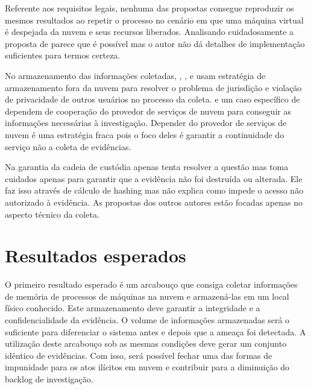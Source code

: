 \documentclass[12pt,				%
	openright,			%
	oneside,			%
	a4paper,			%
	english,			%
	brazil				%
	]{abntex2}
\begin{document}
Referente aos requisitos legais, nenhuma das propostas consegue reproduzir os mesmos resultados ao repetir o processo no cenário em que uma máquina virtual é despejada da nuvem e seus 
recursos liberados. Analisando cuidadosamente a proposta de \cite{George2012} parece que é possível mas o autor não dá detalhes de implementação suficientes para termos certeza.

No armazenamento das informações coletadas, \cite{Reichert2015}, \cite{George2012}, \cite{Poisel2013} e \cite{Dykstra2013} usam estratégia de armazenamento fora da nuvem para 
resolver o problema de jurisdição e violação de privacidade de outros usuários no processo da coleta. \cite{Sang2013} e um caso específico de \cite{George2012} dependem de 
cooperação do provedor de serviços de nuvem para conseguir as informações necessárias à investigação. Depender do provedor de serviços de nuvem é uma estratégia fraca pois o foco
deles é garantir a continuidade do serviço não a coleta de evidências. 

Na garantia da cadeia de custódia apenas \cite{Sang2013} tenta resolver a questão mas toma cuidados apenas para  garantir que a evidência não foi destruída ou alterada. 
Ele faz isso através de cálculo de hashing mas não explica como impede o acesso não autorizado à evidência. As propostas dos outros autores estão focadas apenas no 
aspecto técnico da coleta.

\chapter{Resultados esperados} \label{chap:result}
O primeiro resultado esperado é um arcabouço que consiga coletar informações de memória de processos de máquinas na nuvem e armazená-las em um local físico conhecido.
Este armazenamento deve garantir a integridade e a confidencialidade da evidência. O volume de informações armazenadas será o suficiente para diferenciar o sistema antes 
e depois que a ameaça foi detectada. A utilização deste arcabouço sob as mesmas condições deve gerar um conjunto idêntico de evidências. Com isso, será possível fechar 
uma das formas de impunidade para os atos ilícitos em nuvem e contribuir para a diminuição do backlog de investigação.



\postextual

%  

\begin{comment}
\printindex
\end{comment}

\end{document}
